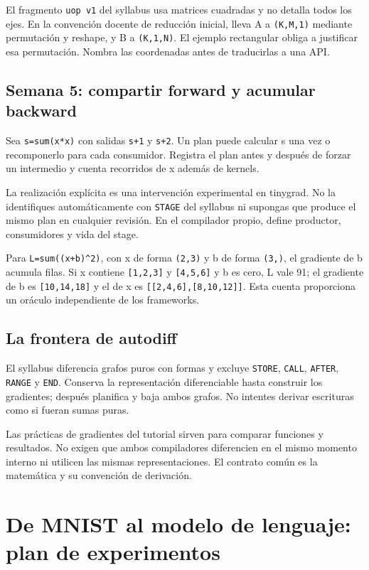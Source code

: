 \documentclass[12pt,a4paper,oneside]{report}
\begin{document}
El fragmento \texttt{uop v1} del syllabus usa matrices cuadradas y no detalla todos los ejes. En la convención docente de reducción inicial, lleva A a \texttt{(K,M,1)} mediante permutación y reshape, y B a \texttt{(K,1,N)}. El ejemplo rectangular obliga a justificar esa permutación. Nombra las coordenadas antes de traducirlas a una API.

\section{Semana 5: compartir forward y acumular backward}
Sea \texttt{s=sum(x*x)} con salidas \texttt{s+1} y \texttt{s+2}. Un plan puede calcular s una vez o recomponerlo para cada consumidor. Registra el plan antes y después de forzar un intermedio y cuenta recorridos de x además de kernels.

La realización explícita es una intervención experimental en tinygrad. No la identifiques automáticamente con \texttt{STAGE} del syllabus ni supongas que produce el mismo plan en cualquier revisión. En el compilador propio, define productor, consumidores y vida del stage.

Para \texttt{L=sum((x+b)\textasciicircum{}2)}, con x de forma \texttt{(2,3)} y b de forma \texttt{(3,)}, el gradiente de b acumula filas. Si x contiene \texttt{[1,2,3]} y \texttt{[4,5,6]} y b es cero, L vale 91; el gradiente de b es \texttt{[10,14,18]} y el de x es \texttt{[[2,4,6],[8,10,12]]}. Esta cuenta proporciona un oráculo independiente de los frameworks.

\section{La frontera de autodiff}
El syllabus diferencia grafos puros con formas y excluye \texttt{STORE}, \texttt{CALL}, \texttt{AFTER}, \texttt{RANGE} y \texttt{END}. Conserva la representación diferenciable hasta construir los gradientes; después planifica y baja ambos grafos. No intentes derivar escrituras como si fueran sumas puras.

Las prácticas de gradientes del tutorial sirven para comparar funciones y resultados. No exigen que ambos compiladores diferencien en el mismo momento interno ni utilicen las mismas representaciones. El contrato común es la matemática y su convención de derivación.

\chapter{De MNIST al modelo de lenguaje: plan de experimentos}
\label{tiny:entrenamiento-syllabus}
\end{document}
